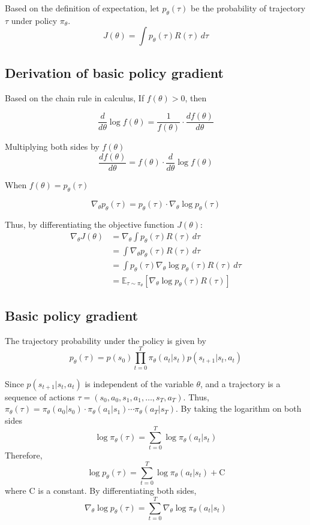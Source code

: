 \documentclass{article} %
\begin{document}
Based on the definition of expectation, let \( p_\theta(\tau) \) be the probability of trajectory \( \tau \) under policy \( \pi_\theta \).  
\[
J(\theta) = \int p_\theta(\tau) R(\tau) \, d\tau
\]

\subsection{Derivation of basic policy gradient}

Based on the chain rule in calculus, If \( f(\theta) > 0 \), then

\[
\frac{d}{d\theta} \log f(\theta) = \frac{1}{f(\theta)} \cdot \frac{df(\theta)}{d\theta}
\]

Multiplying both sides by \( f(\theta) \)
\[
\frac{df(\theta)}{d\theta} = f(\theta) \cdot \frac{d}{d\theta} \log f(\theta)
\]

When \( f(\theta) = p_\theta (\tau) \)

\[
\nabla_\theta p_\theta (\tau) = p_\theta (\tau) \cdot \nabla_\theta \log p_\theta (\tau)
\]

Thus, by differentiating the objective function \(J(\theta)\):
\begin{align*}
\nabla_\theta J(\theta) &= \nabla_\theta \int p_\theta(\tau) R(\tau) \,d\tau \\
&= \int \nabla_\theta p_\theta(\tau) R(\tau) \,d\tau \\
&= \int p_\theta(\tau) \nabla_\theta \log p_\theta(\tau) R(\tau) \,d\tau \\
&= \mathbb{E}_{\tau \sim \pi_\theta} \left[ \nabla_\theta \log p_\theta(\tau) R(\tau) \right]
\end{align*}

\subsection{Basic policy gradient}
The trajectory probability under the policy is given by
\[p_\theta(\tau) = p(s_0) \prod_{t=0}^{T} \pi_\theta(a_t|s_t) p(s_{t+1}|s_t, a_t)\]

Since \( p(s_{t+1}|s_t, a_t) \) is independent of the variable $\theta$, and a trajectory is a sequence of actions $\tau = (s_0, a_0, s_1, a_1, \ldots, s_T, a_T)$. Thus, $\pi_\theta(\tau) = \pi_\theta(a_0|s_0) \cdot \pi_\theta(a_1|s_1) \cdots \pi_\theta(a_T|s_T)$. By taking the logarithm on both sides
\[
\log \pi_\theta(\tau) = \sum_{t=0}^T \log \pi_\theta(a_t|s_t)
\]
Therefore, 
\[\log p_\theta(\tau) = \sum_{t=0}^{T} \log \pi_\theta(a_t|s_t) + \text{C}\]
where C is a constant. By differentiating both sides,
\[\nabla_\theta \log p_\theta(\tau) = \sum_{t=0}^{T} \nabla_\theta \log \pi_\theta(a_t|s_t)\]
\end{document}
